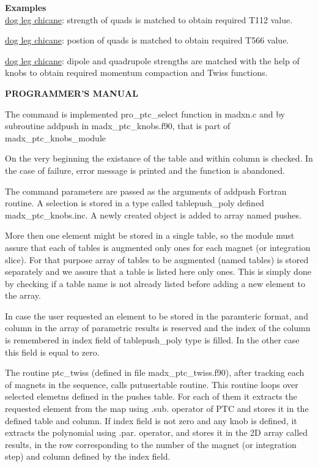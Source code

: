 {\bf Examples}\\

\href{http://cern.ch/frs/mad-X_examples/ptc_madx_interface/ptc_secordmatch/chicane.madx}{dog
  leg chicane}: strength of quads is matched to obtain required T112
value.    

\href{http://cern.ch/frs/mad-X_examples/ptc_madx_interface/eplacement/chicane.madx}{dog
  leg chicane}: postion of quads is matched to obtain required T566
value.   

\href{http://cern.ch/frs/mad-X_examples/ptc_madx_interface/matchwithknobs/matchwithknobs.madx}{dog
  leg chicane}: dipole and quadrupole strengths are matched with the
help of knobs to obtain required momentum compaction and Twiss
functions.   


{\bf PROGRAMMER'S MANUAL} 

The command is implemented pro\_ptc\_select function in madxn.c and  by
subroutine addpush in madx\_ptc\_knobs.f90, that is part of
madx\_ptc\_knobs\_module   

On the very beginning the existance of the table and within column is
checked. In the case of failure, error message is printed and the
function is abandoned.   

The command parameters are passed as the arguments of addpush Fortran
routine.  A selection is stored in a type called tablepush\_poly defined
madx\_ptc\_knobs.inc. A newly created object is added to array named
pushes.    

More then one element might be stored in a single table, so the module
must assure that  each of tables is augmented only ones for each magnet
(or integration slice).  For that purpose array of tables to be
augmented (named tables) is stored separately and  we assure that a
table is listed here only ones. This is simply done by checking  if a
table name is not already listed before adding a new element to the
array.   

In case the user requested an element to be stored in the paramteric
format, and column in the array of parametric results is reserved and
the index of the column is remembered in index field of tablepush\_poly
type is filled. In the other case this field is equal to zero.   

The routine ptc\_twiss (defined in file madx\_ptc\_twiss.f90), after
tracking each of magnets  in the sequence, calls putusertable
routine. This routine loops over selected elemetns defined in the pushes
table. For each of them it extracts the requested element from the map
using .sub.  operator of PTC and stores it in the defined table and
column.  If index field is not zero and any knob is defined, it extracts
the polynomial using .par. operator, and stores it in the 2D array
called results, in the row corresponding to the number of the magnet (or
integration step) and column defined by the index field.     

